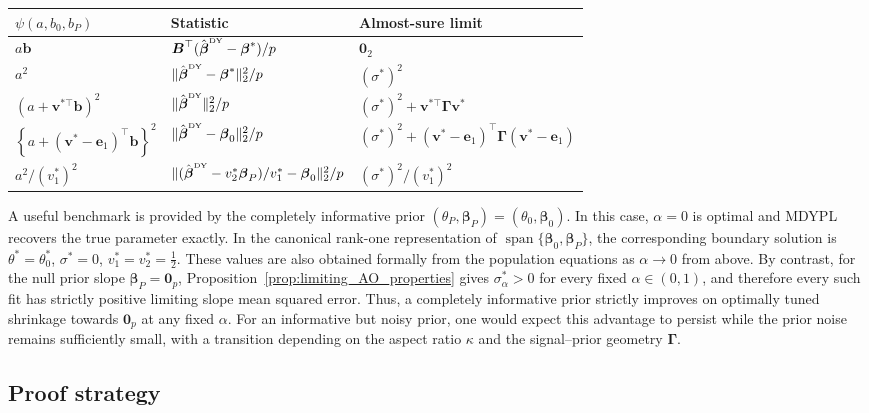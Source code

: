 \documentclass{article}
\makeatletter
\theoremstyle{definition}
\newcommand{\vnorm}[1]{%
	\ensuremath{%
		\if@display
		\left\| #1 \right\|
		\else
		\| #1 \|
		\fi
	}%
}
\newcommand*{\bb}{\boldsymbol}
\newcommand{\betady}{\ensuremath{\hat{\bbeta}^{\textrm{\tiny DY}}}}
\def\bv{\bb{v}}
\def\bbeta{\bb{\beta}}
\newcommand{\vspan}{\operatorname{span}}
\makeatother
\begin{document}
\begin{bibunit}
\begin{table}[ht]
\begin{tabularx}{\textwidth}{
    @{}
    >{\raggedright\arraybackslash}p{}
    >{\raggedright\arraybackslash}X
    >{\raggedright\arraybackslash}p{}
    @{}
}
\toprule
$\psi(a,b_0,b_P)$
&
Statistic
&
Almost-sure limit
\\
\midrule
$a\bb b$
&
$\bb B^\top(\betady-\bbeta^*)/p$
&
$\bb0_2$
\\
$a^2$
&
$\vnorm{\betady-\bbeta^*}_2^2/p$
&
$(\sigma^*)^2$
\\
$\left(a+\bv^{*\top}\bb b\right)^2$
&
$\vnorm{\betady}_2^2/p$
&
$(\sigma^*)^2+\bv^{*\top}\bb\Gamma\bv^*$
\\
$\left\{a+(\bv^*-\bb e_1)^\top\bb b\right\}^2$
&
$\vnorm{\betady-\bbeta_0}_2^2/p$
&
$(\sigma^*)^2+
(\bv^*-\bb e_1)^\top
\bb\Gamma
(\bv^*-\bb e_1)$
\\
$a^2/(v_1^*)^2$
&
$\vnorm{(\betady-v_2^*\bbeta_P)/v_1^*-\bbeta_0}_2^2/p$
&
$(\sigma^*)^2/(v_1^*)^2$
\\
\bottomrule
\end{tabularx}
\end{table}
A useful benchmark is provided by the completely informative prior
$(\theta_P,\bbeta_P)=(\theta_0,\bbeta_0)$. In this case, $\alpha=0$ is
optimal and MDYPL recovers the true parameter exactly. In the canonical
rank-one representation of $\vspan\{\bbeta_0,\bbeta_P\}$, the corresponding
boundary solution is
$
    \theta^*=\theta_0^*$, $
    \sigma^*=0$, $
    v_1^*=v_2^*=\frac12$.
These values are also obtained formally from the population equations as
$\alpha\to 0$ from above. By contrast, for the null prior slope
$\bbeta_P=\bb0_p$, Proposition~\ref{prop:limiting_AO_properties} gives
$\sigma_\alpha^*>0$ for every fixed $\alpha\in(0,1)$, and therefore every
such fit has strictly positive limiting slope mean squared error. 
Thus, a completely informative prior strictly improves on optimally tuned
shrinkage towards $\bb0_p$ at any fixed $\alpha$. For an informative but noisy prior, one would
expect this advantage to persist while the prior noise remains sufficiently
small, with a transition depending on the aspect ratio $\kappa$ and the
signal--prior geometry $\bb\Gamma$. 


\subsection{Proof strategy}
\label{sec:proof-strategy-main}


\end{bibunit}
\end{document}
